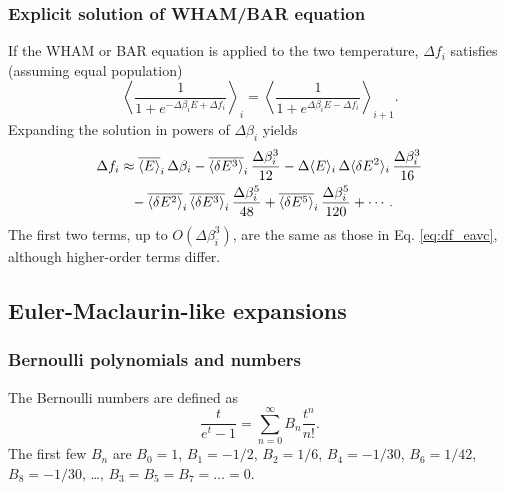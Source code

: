 \documentclass[aip,jcp,preprint,notitlepage, superscriptaddress]{revtex4-1}
\begin{document}
\subsubsection{Explicit solution of WHAM/BAR equation}



If the WHAM or BAR equation
is applied to the two temperature,
$\Delta f_i$ satisfies
(assuming equal population)
%
\begin{equation*}
\left\langle
\frac{ 1 }
{ 1 + e^{-\Delta \beta_i E + \Delta f_i} }
\right\rangle_i
=
\left\langle
\frac{ 1 }
{ 1 + e^{\Delta \beta_i E - \Delta f_i} }
\right\rangle_{i+1}.
\end{equation*}
%
Expanding the solution
in powers of $\Delta \beta_i$
yields
\begin{align}
\Delta f_i
&
\approx
\overline{ \langle E \rangle }_i \, \Delta \beta_i
%
-\overline{ \langle \delta E^3 \rangle }_i
\, \frac{ \Delta \beta_i^3 } { 12 }
%
-\Delta \langle E \rangle_i
\, \Delta \langle \delta E^2 \rangle_i
\, \frac{ \Delta \beta_i^3 } { 16 }
\notag \\
&
\phantom{\approx}
%
-\overline{ \langle \delta E^2 \rangle }_i
\, \overline{ \langle \delta E^3 \rangle }_i
\, \frac{ \Delta \beta_i^5 } { 48 }
%
+\overline{ \langle \delta E^5 \rangle }_i
\, \frac{ \Delta \beta_i^5 } { 120 }
+ \cdots.
\notag
\end{align}
%
The first two terms, up to $O(\Delta \beta_i^3)$,
are the same as those in Eq. \eqref{eq:df_eavc},
although higher-order terms differ.
%





\subsection{Euler-Maclaurin-like expansions}



\subsubsection{Bernoulli polynomials and numbers}



The Bernoulli numbers are defined as
%
\begin{equation}
  \frac{ t }
  {e^t - 1}
=
\sum_{n = 0}^\infty
  B_n \frac{ t^n } { n! }.
\label{eq:Bernoulli_number}
\end{equation}
%
The first few $B_n$ are\cite{
  whittaker, arfken, abramowitz, wang_specfunc}
$B_0 = 1$,
$B_1 = -1/2$,
$B_2 = 1/6$,
$B_4 = -1/30$,
$B_6 = 1/42$,
$B_8 = -1/30$,
\dots,
$B_3 = B_5 = B_7 = \dots = 0$.
\end{document}
